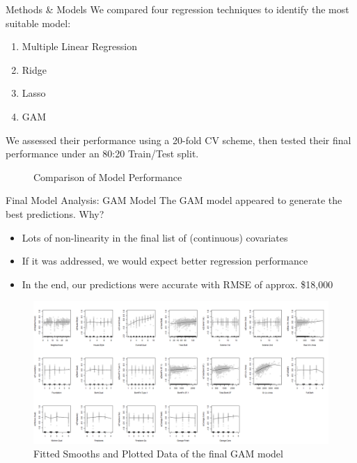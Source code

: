 \documentclass[10pt,usenames,dvipsnames,t,leqno]{beamer}
\begin{document}
\begin{frame}{Methods \& Models}
We compared four regression techniques to identify the most suitable model:
\begin{multicols}{2}
\begin{enumerate}
\itemsep0em
    \item Multiple Linear Regression
    \item Ridge
    \item Lasso
    \item GAM
\end{enumerate}
\end{multicols}
We assessed their performance using a 20-fold CV scheme, then tested their final performance under an 80:20 Train/Test split.
\begin{figure}
    \centering
    \qquad
    \caption{Comparison of Model Performance}
    \label{fig:example}
\end{figure}
\end{frame}

\begin{frame}{Final Model Analysis: GAM Model}
The GAM model appeared to generate the best predictions. Why?
\begin{itemize}
\itemsep0em
\item Lots of non-linearity in the final list of (continuous) covariates
\item If it was addressed, we would expect better regression performance
\item In the end, our predictions were accurate with RMSE of approx. \$18,000
\end{itemize}
\begin{figure}
   \centering
    \includegraphics[width=0.8\linewidth]{gam_smooths.png}
    \caption{Fitted Smooths and Plotted Data of the final GAM model}
    \label{fig:example}
\end{figure}
\end{frame}
\end{document}
